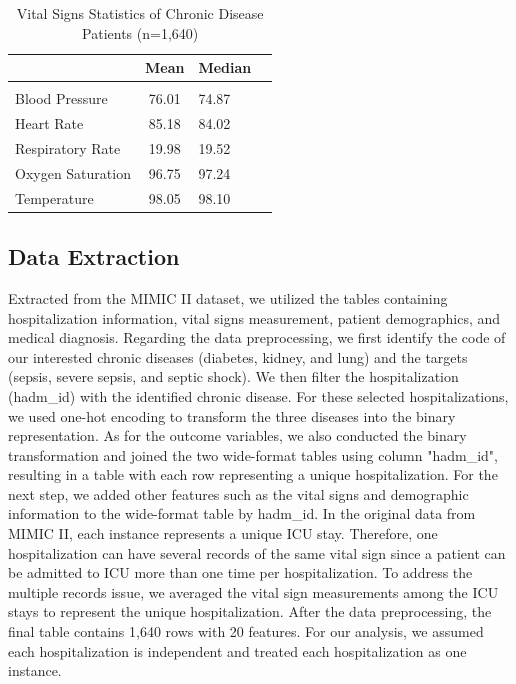 \documentclass[twoside,11pt]{article}
\begin{document}
\begin{table}[htbp]
	\centering 
	\begin{tabular}{lclc} 
		& Mean & Median \\ 
		\hline \\[-11pt]
		Blood Pressure & 76.01 & 74.87 \\ 
		Heart Rate & 85.18 & 84.02\\
		Respiratory Rate & 19.98 & 19.52\\
		Oxygen Saturation & 96.75 & 97.24\\
		Temperature & 98.05 & 98.10\\
		\hline 
	\end{tabular}
	\label{tab:example} 
	\caption{Vital Signs Statistics of Chronic Disease Patients (n=1,640)} 
\end{table}

\subsection{Data Extraction}
Extracted from the MIMIC II dataset, we utilized the tables containing hospitalization information, vital signs measurement, patient demographics, and medical diagnosis. Regarding the data preprocessing, we first identify the code of our interested chronic diseases (diabetes, kidney, and lung) and the targets (sepsis, severe sepsis, and septic shock). We then filter the hospitalization (hadm\_id) with the identified chronic disease. For these selected hospitalizations, we used one-hot encoding to transform the three diseases into the binary representation. As for the outcome variables, we also conducted the binary transformation and joined the two wide-format tables using column "hadm\_id", resulting in a table with each row representing a unique hospitalization. For the next step, we added other features such as the vital signs and demographic information to the wide-format table by hadm\_id. In the original data from MIMIC II, each instance represents a unique ICU stay. Therefore, one hospitalization can have several records of the same vital sign since a patient can be admitted to ICU more than one time per hospitalization. To address the multiple records issue, we averaged the vital sign measurements among the ICU stays to represent the unique hospitalization. After the data preprocessing, the final table contains 1,640 rows with 20 features. For our analysis, we assumed each hospitalization is independent and treated each hospitalization as one instance.
\end{document}
